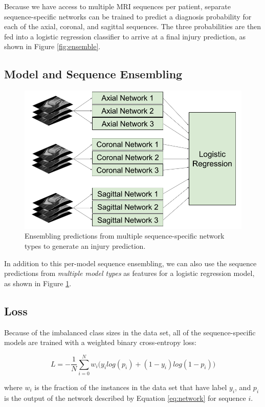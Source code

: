 \documentclass[10pt,twocolumn,letterpaper]{article}
\begin{document}
Because we have access to multiple MRI sequences per patient, separate sequence-specific networks can be trained to predict a diagnosis probability for each of the axial, coronal, and sagittal sequences. The three probabilities are then fed into a logistic regression classifier to arrive at a final injury prediction, as shown in Figure \ref{fig:ensemble}.

\subsection{Model and Sequence Ensembling}
\begin{figure}
\begin{center}
\includegraphics[width=0.8\linewidth]{../images/diagram/ensemble-of-ensembles.png}
\end{center}
   \caption{Ensembling predictions from multiple sequence-specific network types to generate an injury prediction.}
\label{fig:ensemble-of-ensembles}
\end{figure}

In addition to this per-model sequence ensembling, we can also use the sequence predictions from \textit{multiple model types} as features for a logistic regression model, as shown in Figure \ref{fig:ensemble-of-ensembles}.

\subsection{Loss}

Because of the imbalanced class sizes in the data set, all of the sequence-specific models are trained with a weighted binary cross-entropy loss:

$$ L = -\frac{1}{N} \sum_{i=0}^N w_i \big(y_i log(p_i) + (1 - y_i) log(1 - p_i)\big)$$

where $w_i$ is the fraction of the instances in the data set that have label $y_i$, and $p_i$ is the output of the network described by Equation \ref{eq:network} for sequence $i$.
\end{document}
